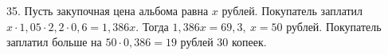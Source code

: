 35. Пусть закупочная цена альбома равна $x$ рублей. Покупатель заплатил $x\cdot1,05\cdot2,2\cdot0,6=1,386x.$ Тогда $1,386x=69,3,\ x=50$ рублей. Покупатель заплатил больше на $50\cdot0,386=19$ рублей 30 копеек.\\
